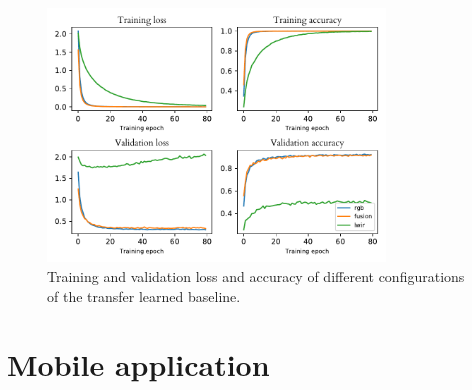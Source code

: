 \documentclass{l4proj}
\begin{document}
\begin{appendices}
\begin{figure}[ht]
  \centering
  \includegraphics[width=0.8\textwidth]{images/evaluation/baseline}
  \caption{Training and validation loss and accuracy of different configurations of the transfer learned baseline.}
  \label{fig:baseline_configs}
\end{figure}


\chapter{Mobile application}


\end{appendices}
\end{document}
